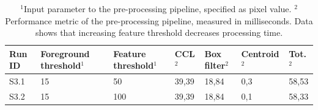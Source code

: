 \documentclass[12pt]{report}
\begin{document}
\begin{table}[!h]
    \centering
    \begin{tabular}{|p{0.8cm}|p{2.5cm}|p{2cm}||p{1.25cm}|p{1.25cm}|p{1.9cm}|p{1cm}|}
        \hline
        \textbf{Run ID}&\textbf{Foreground threshold$^{1}$}&\textbf{Feature threshold$^{1}$}&\textbf{CCL$^{2}$}&\textbf{Box filter$^{2}$}&\textbf{Centroid$^{2}$}&\textbf{Tot.$^{2}$}\\
        \hline
        \hline
        S3.1&15&50&39,39&18,84&0,3&58,53\\
        \hline
        S3.2&15&100&39,39&18,84&0,1&58,33\\
        \hline
    \end{tabular}
    \caption{$^{1}$Input parameter to the pre-processing pipeline, specified as pixel value. $^{2}$Performance metric of the pre-processing pipeline, measured in milliseconds. Data shows that increasing feature threshold decreases processing time.}
    \label{table:s2_res}
\end{table}
\end{document}
